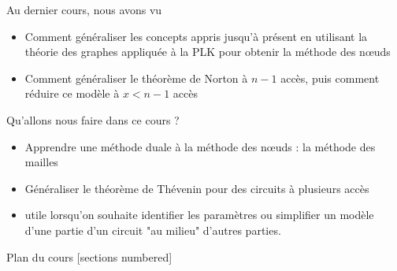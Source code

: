 \titleframe



\begin{frame}{Au dernier cours, nous avons vu}
\begin{itemize}
  \item Comment généraliser les concepts appris jusqu'à présent en utilisant la théorie des graphes appliquée à la PLK pour obtenir la méthode des n{\oe}uds
  \item Comment généraliser le théorème de Norton à $n-1$ accès, puis comment réduire ce modèle à $x<n-1$ accès
\end{itemize}

\end{frame}\begin{frame}{Qu'allons nous faire dans ce cours ?}
\begin{itemize}
  \item Apprendre une méthode duale à la méthode des n{\oe}uds : la méthode des mailles
  \item Généraliser le théorème de Thévenin pour des circuits à plusieurs accès
  \item utile lorsqu'on souhaite identifier les paramètres ou simplifier un modèle d'une partie d'un circuit "au milieu" d'autres parties.
\end{itemize}
\end{frame}

\begin{frame}{Plan du cours}
  [sections numbered]
  \tableofcontents[hideallsubsections]
\end{frame}



